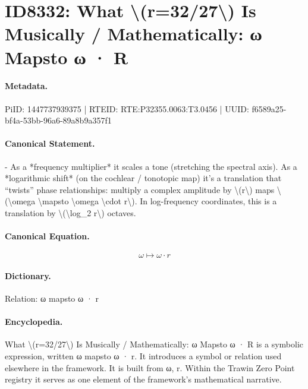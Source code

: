 \section*{ID8332: What \textbackslash{}(r=32/27\textbackslash{}) Is Musically / Mathematically: ω Mapsto ω · R}
\paragraph{Metadata.}
PiID: 1447737939375 | RTEID: RTE:P32355.0063:T3.0456 | UUID: f6589a25-bf4a-53bb-96a6-89a8b9a357f1

\paragraph{Canonical Statement.}
- As a *frequency multiplier* it scales a tone (stretching the spectral axis). As a *logarithmic shift* (on the cochlear / tonotopic map) it’s a translation that “twists” phase relationships: multiply a complex amplitude by \textbackslash{}(r\textbackslash{}) maps \textbackslash{}(\textbackslash{}omega \textbackslash{}mapsto \textbackslash{}omega \textbackslash{}cdot r\textbackslash{}). In log-frequency coordinates, this is a translation by \textbackslash{}(\textbackslash{}log\_2 r\textbackslash{}) octaves.

\paragraph{Canonical Equation.}
\[
\omega \mapsto \omega \cdot r
\]

\paragraph{Dictionary.}
Relation: ω mapsto ω · r

\paragraph{Encyclopedia.}
What \textbackslash{}(r=32/27\textbackslash{}) Is Musically / Mathematically: ω Mapsto ω · R is a symbolic expression, written ω mapsto ω · r. It introduces a symbol or relation used elsewhere in the framework. It is built from ω, r. Within the Trawin Zero Point registry it serves as one element of the framework's mathematical narrative.
